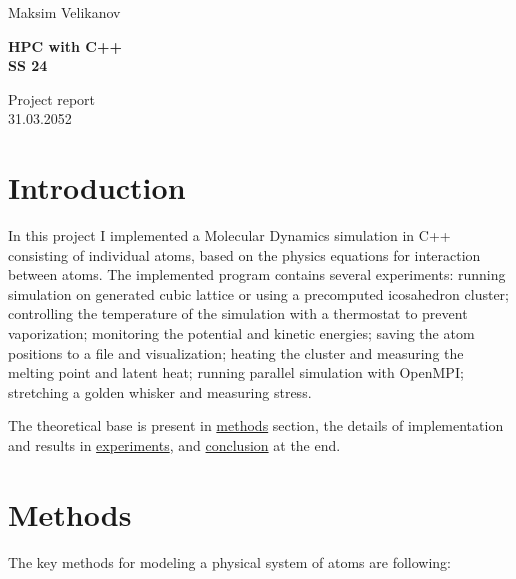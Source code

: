 \documentclass[12pt,a4paper]{article}
\title{}
\author{}
\begin{document}
\parbox{0.333\textwidth}{
	Maksim Velikanov \\[0mm]
}
\parbox{0.333\textwidth}{\vspace*{1mm}\begin{center}\large\bf%
		HPC with C++\\[0mm]
		SS 24\\[0mm]
\end{center}}
\parbox{0.333\textwidth}{
	\begin{flushright}
		Project report\\[0mm]
		31.03.2052\\[0mm]
	\end{flushright}
}
\par\vspace{-5mm}
\vspace*{2mm}
\raisebox{1.19cm}{%
	\textcolor{freiburg-gray}{\rule{\textwidth}{1.1mm}}}

\bigskip




\section{Introduction}

In this project I implemented a Molecular Dynamics simulation in C++ consisting of individual atoms, based on the physics equations for interaction between atoms. The implemented program contains several experiments: running simulation on generated cubic lattice or using a precomputed icosahedron cluster; controlling the temperature of the simulation with a thermostat to prevent vaporization; monitoring the potential and kinetic energies; saving the atom positions to a file and visualization; heating the cluster and measuring the melting point and latent heat; running parallel simulation with OpenMPI; stretching a golden whisker and measuring stress.

The theoretical base is present in \hyperref[methods]{methods} section, the details of implementation and results in \hyperref[experiments]{experiments}, and \hyperref[conclusion]{conclusion} at the end.

\section{Methods}
\label{methods}

The key methods for modeling a physical system of atoms are following:
\end{document}
